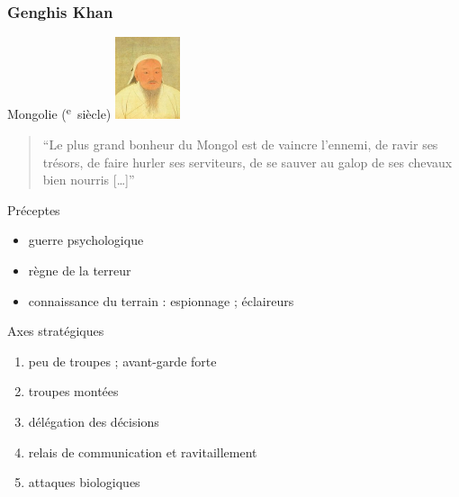 \documentclass{article}
\newcommand{\cRM}[1]{\MakeUppercase{\romannumeral #1}}  %
\newcommand{\siecle}[1]{\cRM{#1}\textsuperscript{e}~siècle}
\begin{document}
\subsubsection{Genghis Khan}
Mongolie (\siecle{12})
\includegraphics[trim=0cm 1cm 0cm 1cm, clip=true, width=1.9cm]{../ressources/genghis_khan}
\begin{quote}“Le plus grand bonheur du Mongol est de vaincre l’ennemi, de ravir ses trésors, de faire hurler ses serviteurs, de se sauver au galop de ses chevaux bien nourris [\ldots]”\end{quote}

Préceptes
\begin{itemize}
\item guerre psychologique
\item règne de la terreur
\item connaissance du terrain : espionnage ; éclaireurs
\end{itemize}
Axes stratégiques
\begin{enumerate}
\item peu de troupes ; avant-garde forte
\item troupes montées %
\item délégation des décisions
\item relais de communication et ravitaillement
\item attaques biologiques
\end{enumerate}
\cite{khan_wiki, military_strategy, mongol_army}
\end{document}
